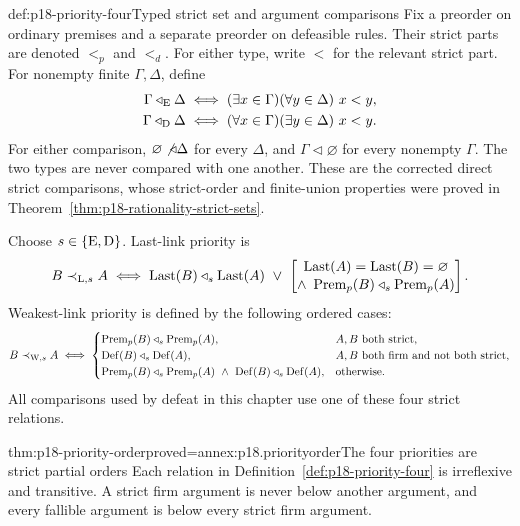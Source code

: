 \begin{hbdefinition}{def:p18-priority-four}{Typed strict set and argument comparisons}
Fix a preorder on ordinary premises and a separate preorder on defeasible
rules. Their strict parts are denoted \(<_p\) and \(<_d\).
For either type, write \(<\) for the relevant strict part.
For nonempty finite \(\Gamma,\Delta\), define
\[
\begin{aligned}
 \Gamma\triangleleft_{\rm E}\Delta
   &\iff(\exists x\in\Gamma)(\forall y\in\Delta)\ x<y,\\
 \Gamma\triangleleft_{\rm D}\Delta
   &\iff(\forall x\in\Gamma)(\exists y\in\Delta)\ x<y.
\end{aligned}
\]
For either comparison, \(\varnothing\not\triangleleft\Delta\) for every
\(\Delta\), and \(\Gamma\triangleleft\varnothing\) for every nonempty
\(\Gamma\). The two types are never compared with one another.
These are the corrected direct strict comparisons, whose strict-order
and finite-union properties were proved in
Theorem~\ref{thm:p18-rationality-strict-sets}.

Choose \(s\in\{{\rm E},{\rm D}\}\). Last-link priority is
\[
 B\prec_{{\rm L},s}A
 \iff \operatorname{Last}(B)\triangleleft_s\operatorname{Last}(A)
 \ \lor\
 \left[
 \begin{gathered}
 \operatorname{Last}(A)=\operatorname{Last}(B)=\varnothing\\[-2pt]
 \land\ \operatorname{Prem}_p(B)\triangleleft_s\operatorname{Prem}_p(A)
 \end{gathered}\right].
\]
Weakest-link priority is defined by the following ordered cases:
\[
 B\prec_{{\rm W},s}A\iff
 \begin{cases}
 \operatorname{Prem}_p(B)\triangleleft_s\operatorname{Prem}_p(A),
       &A,B\text{ both strict},\\
 \operatorname{Def}(B)\triangleleft_s\operatorname{Def}(A),
       &A,B\text{ both firm and not both strict},\\
 \operatorname{Prem}_p(B)\triangleleft_s\operatorname{Prem}_p(A)
 \ \land\
 \operatorname{Def}(B)\triangleleft_s\operatorname{Def}(A),
       &\text{otherwise}.
 \end{cases}
\]
All comparisons used by defeat in this chapter use one of these four
strict relations.
\end{hbdefinition}

\begin{hbtheorem}{thm:p18-priority-order}{proved=annex:p18.priorityorder}{The four priorities are strict partial orders}
Each relation in Definition~\ref{def:p18-priority-four} is irreflexive
and transitive. A strict firm argument is never below another argument,
and every fallible argument is below every strict firm argument.
\end{hbtheorem}

